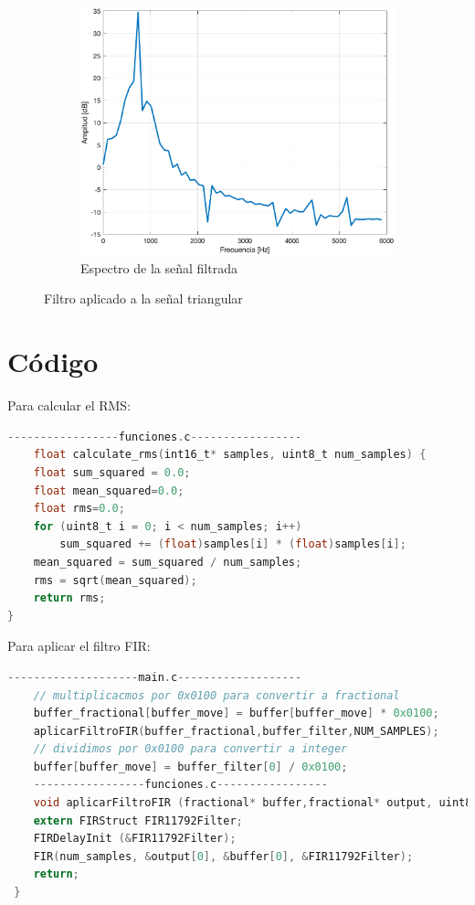 \documentclass{article}
\begin{document}
\begin{figure}[H]
\begin{subfigure}{.3\textwidth}
    \end{subfigure}
    \hfill
    \begin{subfigure}{.3\textwidth}
        \centering
        \includegraphics[width=\linewidth]{images/V2_Espectro.png}
        \caption{Espectro de la señal filtrada}
        \label{fig:triangular_3}
    \end{subfigure}    \caption{Filtro aplicado a la señal triangular}
    \label{fig:triangular_filtro}
\end{figure}

\section{Código}
Para calcular el RMS:
\begin{lstlisting}[language=C]
    -----------------funciones.c-----------------
    float calculate_rms(int16_t* samples, uint8_t num_samples) {
    float sum_squared = 0.0;
    float mean_squared=0.0;
    float rms=0.0;
    for (uint8_t i = 0; i < num_samples; i++) 
        sum_squared += (float)samples[i] * (float)samples[i];
    mean_squared = sum_squared / num_samples;
    rms = sqrt(mean_squared);
    return rms;
}
\end{lstlisting}
Para aplicar el filtro FIR:
\begin{lstlisting}[language=C]
    --------------------main.c-------------------
    // multiplicacmos por 0x0100 para convertir a fractional
    buffer_fractional[buffer_move] = buffer[buffer_move] * 0x0100;
    aplicarFiltroFIR(buffer_fractional,buffer_filter,NUM_SAMPLES);
    // dividimos por 0x0100 para convertir a integer
    buffer[buffer_move] = buffer_filter[0] / 0x0100;
    -----------------funciones.c-----------------
    void aplicarFiltroFIR (fractional* buffer,fractional* output, uint8_t num_samples){
    extern FIRStruct FIR11792Filter;
    FIRDelayInit (&FIR11792Filter); 
    FIR(num_samples, &output[0], &buffer[0], &FIR11792Filter);
    return; 
 }
\end{lstlisting}
\end{document}
